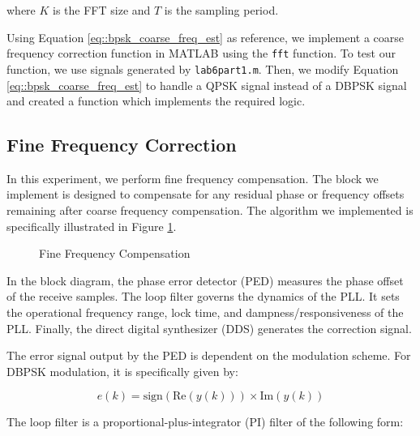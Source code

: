 \documentclass{article}
\begin{document}
\noindent where $K$ is the FFT size and $T$ is the sampling period.

Using Equation \ref{eq::bpsk_coarse_freq_est} as reference, we implement a coarse frequency correction function in MATLAB using the \texttt{fft} function. To test our function, we use signals generated by \texttt{lab6part1.m}. Then, we modify Equation \ref{eq::bpsk_coarse_freq_est} to handle a QPSK signal instead of a DBPSK signal and created a function which implements the required logic.

\subsection{Fine Frequency Correction}

In this experiment, we perform fine frequency compensation. The block we implement is designed to compensate for any residual phase or frequency offsets remaining after coarse frequency compensation. The algorithm we implemented is specifically illustrated in Figure \ref{fig::fine_freq_comp_block_diagram}.

\begin{figure}[H]
	\centerline{}
	\caption{Fine Frequency Compensation}
	\label{fig::fine_freq_comp_block_diagram}
\end{figure}

In the block diagram, the phase error detector (PED) measures the phase offset of the receive samples. The loop filter governs the dynamics of the PLL. It sets the operational frequency range, lock time, and dampness/responsiveness of the PLL. Finally, the direct digital synthesizer (DDS) generates the correction signal.

The error signal output by the PED is dependent on the modulation scheme. For DBPSK modulation, it is specifically given by:

\begin{equation}
e(k) = \text{sign}(\text{Re}(y(k))) \times \text{Im}(y(k))
\end{equation}

\noindent The loop filter is a proportional-plus-integrator (PI) filter of the following form:
\end{document}
